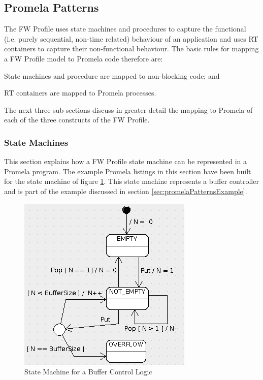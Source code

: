 \documentclass[a4paper,10pt]{article}
\newenvironment{fw_itemize}						%
{\begin{itemize}
  \setlength{\itemsep}{1mm}
  \setlength{\parskip}{0pt}
  \setlength{\parsep}{0pt}}
{\end{itemize}}
\begin{document}
\subsection{Promela Patterns}
The FW Profile uses state machines and procedures to capture the functional (i.e. purely sequential, non-time related) behaviour of an application and uses RT containers to capture their non-functional behaviour. The basic rules for mapping a FW Profile model to Promela code therefore are:

\begin{fw_itemize}
\item State machines and procedure are mapped to non-blocking code; and
\item RT containers are mapped to Promela processes.
\end{fw_itemize}

The next three sub-sections discuss in greater detail the mapping to Promela of each of the three constructs of the FW Profile.

\subsubsection{State Machines}\label{sec:smPromelaPattern}
This section explains how a FW Profile state machine can be represented in a Promela program. The example Promela listings in this section have been built for the state machine of figure \ref{fig:FV_Buffer}. This state machine represents a buffer controller and is part of the example discussed in section \ref{sec:promelaPatternsExample}.

\begin{figure}[ht]
 \centering
 \includegraphics[scale=0.47,keepaspectratio=true]{../images/FV_Buffer.png}
 \caption{State Machine for a Buffer Control Logic}
 \label{fig:FV_Buffer}
\end{figure}
\end{document}
